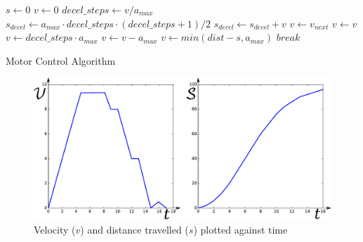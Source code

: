 \begin{algorithm}[h]
  \begin{algorithmic}[1]
\State $s \gets 0$
\State $v \gets 0$
  \State $decel\_steps\gets v / a_{max}$
  \State $s_{decel} \gets a_{max} \cdot decel\_steps \cdot (decel\_steps + 1) / 2$
    \State $s_{decel} \gets s_{decel} + v$
  \EndIf
    \State $v \gets v_{next}$ 
    \State $ v \gets v $     
  \Else
      \State $v \gets decel\_steps \cdot a_{max}$
    \Else
      \State $v \gets v - a_{max}$
    \EndIf
      
      \State $v \gets min(dist - s, a_{max})$
    \Else
      \State $break$  
  \EndIf
\EndWhile
\end{algorithmic}
\caption{Motor Control Algorithm\label{alg-motor}}
\end{algorithm}
\begin{figure}[h]
  \centerline{\includegraphics[scale=0.65]{fig/motor_control_graph.pdf}}
\caption{Velocity ($v$) and distance travelled ($s$) plotted against time\label{fig-motor}}
\end{figure}

